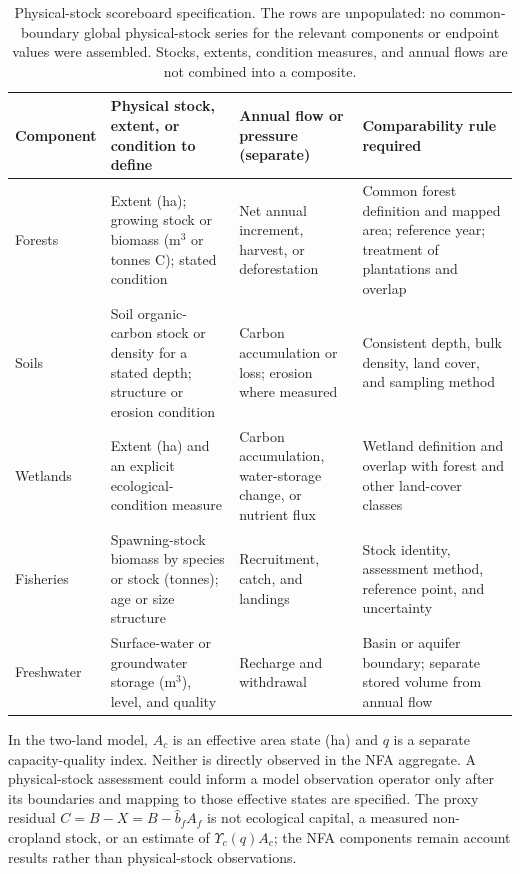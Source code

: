 \documentclass[11pt,a4paper]{article}
\newcommand{\Ups}{\Upsilon_c}
\begin{document}
\begin{table}[htbp]
\centering\footnotesize
\caption{Physical-stock scoreboard specification. The rows are unpopulated: no common-boundary global physical-stock series for the relevant components or endpoint values were assembled. Stocks, extents, condition measures, and annual flows are not combined into a composite.}
\label{tab:si_stock_scoreboard}
\begin{tabularx}{\textwidth}{@{}>{\raggedright\arraybackslash}p{} >{\raggedright\arraybackslash}p{} >{\raggedright\arraybackslash}p{} >{\raggedright\arraybackslash}X@{}}
\toprule
Component & Physical stock, extent, or condition to define & Annual flow or pressure (separate) & Comparability rule required \\
\midrule
Forests & Extent (ha); growing stock or biomass (m$^3$ or tonnes C); stated condition & Net annual increment, harvest, or deforestation & Common forest definition and mapped area; reference year; treatment of plantations and overlap \\
Soils & Soil organic-carbon stock or density for a stated depth; structure or erosion condition & Carbon accumulation or loss; erosion where measured & Consistent depth, bulk density, land cover, and sampling method \\
Wetlands & Extent (ha) and an explicit ecological-condition measure & Carbon accumulation, water-storage change, or nutrient flux & Wetland definition and overlap with forest and other land-cover classes \\
Fisheries & Spawning-stock biomass by species or stock (tonnes); age or size structure & Recruitment, catch, and landings & Stock identity, assessment method, reference point, and uncertainty \\
Freshwater & Surface-water or groundwater storage (m$^3$), level, and quality & Recharge and withdrawal & Basin or aquifer boundary; separate stored volume from annual flow \\
\bottomrule
\end{tabularx}
\end{table}

In the two-land model, $A_c$ is an effective area state (ha) and $q$ is a separate capacity-quality index. Neither is directly observed in the NFA aggregate. A physical-stock assessment could inform a model observation operator only after its boundaries and mapping to those effective states are specified. The proxy residual $C=B-X=B-\hat b_fA_f$ is not ecological capital, a measured non-cropland stock, or an estimate of $\Ups(q)A_c$; the NFA components remain account results rather than physical-stock observations.
\end{document}
